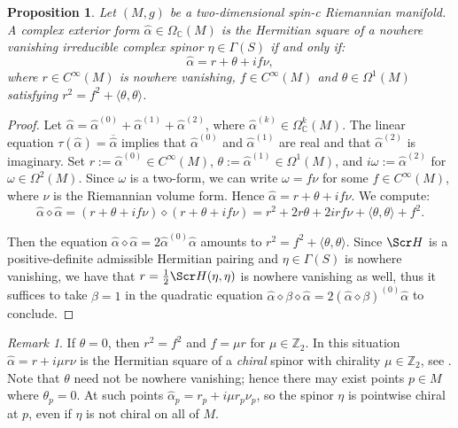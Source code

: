 \documentclass[10pt,a4paper,twoside,reqno]{amsart}
\theoremstyle{plain}
\newtheorem{prop}[thm]{Proposition}
\theoremstyle{definition}
\theoremstyle{remark}
\newtheorem{remark}[thm]{Remark}
\def\Z{\mathbb{Z}}
\def\C{\mathbb{C}}
\def\scS{\Scr H}
\newcommand{\escal}[1]{\langle#1\rangle}
\begin{document}
\begin{prop}\label{prop:square_(2,0)}
    Let $(M,g)$ be a two-dimensional spin-c Riemannian manifold. A complex exterior form $\widehat{\alpha}\in\Omega_\C(M)$ is the Hermitian square of a nowhere vanishing irreducible complex spinor $\eta\in\Gamma(S)$ if and only if: $$\widehat{\alpha}=r+\theta+if\nu,$$ where $r\in C^\infty(M)$ is nowhere vanishing, $f\in C^\infty(M)$ and $\theta\in\Omega^1(M)$ satisfying $r^2=f^2+\escal{\theta,\theta}$.
\end{prop}

\begin{proof}
    Let $\widehat{\alpha}=\widehat{\alpha}^{(0)}+\widehat{\alpha}^{(1)}+\widehat{\alpha}^{(2)}$, where $\widehat{\alpha}^{(k)}\in\Omega^k_\C(M)$. The linear equation $\tau(\widehat{\alpha})=\overline{\widehat{\alpha}}$ implies that $\widehat{\alpha}^{(0)}$ and $\widehat{\alpha}^{(1)}$ are real and that $\widehat{\alpha}^{(2)}$ is imaginary. Set $r:=\widehat{\alpha}^{(0)}\in C^\infty(M)$, $\theta:=\widehat{\alpha}^{(1)}\in\Omega^1(M)$, and $i\omega:=\widehat{\alpha}^{(2)}$ for $\omega\in\Omega^2(M)$. Since $\omega$ is a two-form, we can write $\omega=f\nu$ for some $f\in C^\infty(M)$, where $\nu$ is the Riemannian volume form. Hence $\widehat{\alpha}=r+\theta+if\nu$. We compute: $$\widehat{\alpha}\diamond\widehat{\alpha}=(r+\theta+if\nu)\diamond(r+\theta+if\nu)=r^2+2r\theta+2irf\nu+\escal{\theta,\theta}+f^2.$$
    
    Then the equation $\widehat{\alpha}\diamond\widehat{\alpha}=2\widehat{\alpha}^{(0)}\widehat{\alpha}$ amounts to $r^2=f^2+\escal{\theta,\theta}$. Since $\scS$ is a positive-definite admissible Hermitian pairing and $\eta\in\Gamma(S)$ is nowhere vanishing, we have that $r=\frac{1}{2}\scS(\eta,\eta)$ is nowhere vanishing as well, thus it suffices to take $\beta=1$ in the quadratic equation $\widehat{\alpha}\diamond\beta\diamond\widehat{\alpha}=2(\widehat{\alpha}\diamond\beta)^{(0)}\widehat{\alpha}$ to conclude.
\end{proof}

\begin{remark}\label{remark:(2,0)_chiral}
    If $\theta=0$, then $r^2=f^2$ and $f=\mu r$ for $\mu\in\Z_2$. In this situation $\widehat{\alpha}=r+i\mu r\nu$ is the Hermitian square of a \emph{chiral} spinor with chirality $\mu\in\Z_2$, see \cite[Cor.\ 5.1]{Algebraic_Complex_Square_2025}. Note that $\theta$ need not be nowhere vanishing; hence there may exist points $p\in M$ where $\theta_p=0$. At such points $\widehat{\alpha}_p=r_p+i\mu r_p\nu_p$, so the spinor $\eta$ is pointwise chiral at $p$, even if $\eta$ is not chiral on all of $M$.
\end{remark}
\end{document}
